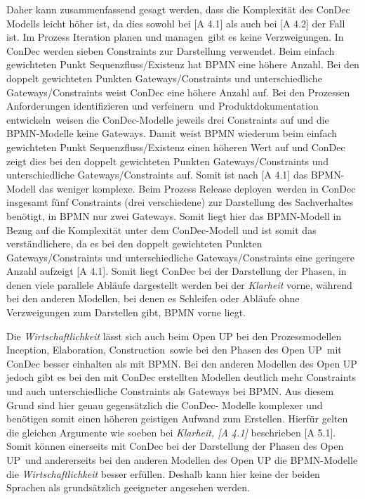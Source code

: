 Daher kann zusammenfassend gesagt werden, dass die Komplexität des ConDec Modells leicht höher ist, da dies sowohl bei [A 4.1] als auch bei [A 4.2] der Fall ist.\newline
Im Prozess  \grqq Iteration planen und managen\grqq \ gibt es keine Verzweigungen. In ConDec werden sieben Constraints zur Darstellung verwendet. Beim einfach gewichteten Punkt Sequenzfluss/Existenz hat BPMN eine höhere Anzahl. Bei den doppelt gewichteten Punkten Gateways/Constraints und unterschiedliche Gateways/Constraints weist ConDec eine höhere Anzahl auf.\newline
Bei den Prozessen  \grqq Anforderungen identifizieren und verfeinern\grqq \ und  \grqq Produktdokumentation entwickeln\grqq \ weisen die ConDec-Modelle jeweils drei Constraints auf und die BPMN-Modelle keine Gateways. Damit weist BPMN wiederum beim einfach gewichteten Punkt Sequenzfluss/Existenz einen höheren Wert auf und ConDec zeigt dies bei den doppelt gewichteten Punkten Gateways/Constraints und unterschiedliche Gateways/Constraints auf. Somit ist nach [A 4.1] das BPMN-Modell das weniger komplexe.\newline
Beim Prozess \grqq Release deployen\grqq \ werden in ConDec insgesamt fünf Constraints (drei verschiedene) zur Darstellung des Sachverhaltes benötigt, in BPMN nur zwei Gateways. Somit liegt hier das BPMN-Modell in Bezug auf die Komplexität unter dem ConDec-Modell und ist somit das verständlichere, da es bei den doppelt gewichteten Punkten Gateways/Constraints und unterschiedliche Gateways/Constraints eine geringere Anzahl aufzeigt [A 4.1].\newline
Somit liegt ConDec bei der Darstellung der Phasen, in denen viele parallele Abläufe dargestellt werden bei der \textit{Klarheit} vorne, während bei den anderen Modellen, bei denen es Schleifen oder Abläufe ohne Verzweigungen zum Darstellen gibt, BPMN vorne liegt.\newline

Die \textit{Wirtschaftlichkeit} lässt sich auch beim Open UP bei den Prozessmodellen \grqq Inception\grqq, \grqq Elaboration\grqq, \grqq Construction\grqq \ sowie bei den \grqq Phasen des Open UP\grqq \ mit ConDec besser einhalten als mit BPMN.  \newline
Bei den anderen Modellen des Open UP jedoch gibt es bei den mit ConDec erstellten Modellen deutlich mehr Constraints und auch unterschiedliche Constraints als  Gateways bei BPMN. Aus diesem Grund sind hier genau gegensätzlich die ConDec- Modelle komplexer und benötigen somit einen höheren geistigen Aufwand zum Erstellen. \newline
Hierfür gelten die gleichen Argumente wie soeben bei \textit{Klarheit, [A 4.1]} beschrieben [A 5.1].
Somit können einerseits mit ConDec bei der Darstellung der \grqq Phasen des Open UP\grqq \ und andererseits bei den anderen Modellen des Open UP die BPMN-Modelle die \textit{Wirtschaftlichkeit} besser erfüllen. Deshalb kann hier keine der beiden Sprachen als grundsätzlich geeigneter angesehen werden.\newline


